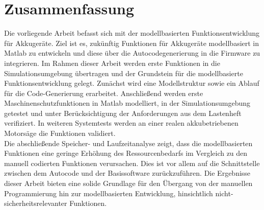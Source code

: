 \chapter*{Zusammenfassung}
Die vorliegende Arbeit befasst sich mit der modellbasierten Funktionsentwicklung für Akkugeräte. Ziel ist es, zukünftig Funktionen für Akkugeräte modellbasiert in Matlab zu entwickeln und diese über die Autocodegenerierung in die Firmware zu integrieren. Im Rahmen dieser Arbeit werden erste Funktionen in die Simulationsumgebung übertragen und der Grundstein für die modellbasierte Funktionsentwicklung gelegt. Zunächst wird eine Modellstruktur sowie ein Ablauf für die Code-Generierung erarbeitet. Anschließend werden erste Maschinenschutzfunktionen in Matlab modelliert, in der Simulationsumgebung getestet und unter Berücksichtigung der Anforderungen aus dem Lastenheft verifiziert. In weiteren Systemtests werden an einer realen akkubetriebenen Motorsäge die Funktionen validiert.\\
Die abschließende Speicher- und Laufzeitanalyse zeigt, dass die modellbasierten Funktionen eine geringe Erhöhung des Ressourcenbedarfs im Vergleich zu den manuell codierten Funktionen verursachen. Dies ist vor allem auf die Schnittstelle zwischen dem Autocode und der Basissoftware zurückzuführen. Die Ergebnisse dieser Arbeit bieten eine solide Grundlage für den Übergang von der manuellen Programmierung hin zur modellbasierten Entwicklung, hinsichtlich nicht-sicherheitsrelevanter Funktionen.

%

